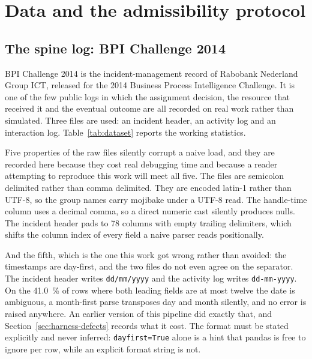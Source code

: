
\section{Data and the admissibility protocol}
\label{sec:data}

\subsection{The spine log: BPI Challenge 2014}
\label{sec:spine-log}

BPI Challenge 2014 \citep{dongen2014challenge} is the incident-management record of Rabobank
Nederland Group ICT, released for the 2014 Business Process Intelligence Challenge. It is one
of the few public logs in which the assignment decision, the resource that received it and the
eventual outcome are all recorded on real work rather than simulated. Three files are used: an
incident header, an activity log and an interaction log. Table~\ref{tab:dataset} reports the
working statistics.

\begin{table}[htbp]
\centering
\caption{Dataset statistics. Counts are produced by \texttt{evaluation/deep\_metrics.py} and
written to \texttt{dataset\_stats.csv}; nothing in this table is typed by hand.}
\label{tab:dataset}


\end{table}

Five properties of the raw files silently corrupt a naive load, and they are recorded here
because they cost real debugging time and because a reader attempting to reproduce this work
will meet all five. The files are semicolon delimited rather than comma delimited. They are
encoded latin-1 rather than UTF-8, so the group names carry mojibake under a UTF-8 read. The
handle-time column uses a decimal comma, so a direct numeric cast silently produces nulls.
The incident header pads to 78 columns with empty trailing delimiters, which shifts the
column index of every field a naive parser reads positionally.

And the fifth, which is the one this work got wrong rather than avoided: the timestamps are
day-first, and the two files do not even agree on the separator. The incident header writes
\texttt{dd/mm/yyyy} and the activity log writes \texttt{dd-mm-yyyy}. On the \SI{41.0}{\percent} of
rows where both leading fields are at most twelve the date is ambiguous, a month-first parse
transposes day and month silently, and no error is raised anywhere. An earlier version of this
pipeline did exactly that, and Section~\ref{sec:harness-defects} records what it cost. The format
must be stated explicitly and never inferred: \texttt{dayfirst=True} alone is a hint that pandas is
free to ignore per row, while an explicit format string is not.


